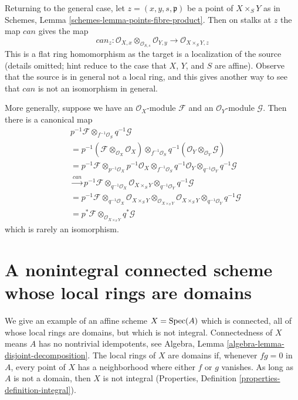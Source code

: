 \medskip\noindent
Returning to the general case, let $z = (x, y, s, \mathfrak p)$
be a point of $X \times_S Y$ as in
Schemes, Lemma \ref{schemes-lemma-points-fibre-product}.
Then on stalks at $z$ the map $can$ gives the map
$$
can_z :
\mathcal{O}_{X, x} \otimes_{\mathcal{O}_{S, s}} \mathcal{O}_{Y, y}
\longrightarrow
\mathcal{O}_{X \times_S Y, z}
$$
This is a flat ring homomorphism as the target is a localization of the
source (details omitted; hint reduce to the case that $X$, $Y$, and $S$
are affine).
Observe that the source is in general not a local ring, and this gives
another way to see that $can$ is not an isomorphism in general.

\medskip\noindent
More generally, suppose we have an $\mathcal{O}_X$-module $\mathcal{F}$ and an
$\mathcal{O}_Y$-module $\mathcal{G}$. Then there is a canonical map
\begin{align*}
& p^{-1}\mathcal{F} \otimes_{f^{-1}\mathcal{O}_S} q^{-1}\mathcal{G} \\
& =
p^{-1}(\mathcal{F} \otimes_{\mathcal{O}_X} \mathcal{O}_X)
\otimes_{f^{-1}\mathcal{O}_S}
q^{-1}(\mathcal{O}_Y \otimes_{\mathcal{O}_Y} \mathcal{G}) \\
& =
p^{-1}\mathcal{F} \otimes_{p^{-1}\mathcal{O}_X} p^{-1}\mathcal{O}_X
\otimes_{f^{-1}\mathcal{O}_S}
q^{-1}\mathcal{O}_Y \otimes_{q^{-1}\mathcal{O}_Y} q^{-1}\mathcal{G} \\
& \xrightarrow{can}
p^{-1}\mathcal{F} \otimes_{q^{-1}\mathcal{O}_X}
\mathcal{O}_{X \times_S Y}
\otimes_{q^{-1}\mathcal{O}_Y} q^{-1}\mathcal{G}  \\
& =
p^{-1}\mathcal{F} \otimes_{q^{-1}\mathcal{O}_X}
\mathcal{O}_{X \times_S Y}
\otimes_{\mathcal{O}_{X \times_S Y}}
\mathcal{O}_{X \times_S Y}
\otimes_{q^{-1}\mathcal{O}_Y} q^{-1}\mathcal{G}  \\
& =
p^*\mathcal{F} \otimes_{\mathcal{O}_{X \times_S Y}} q^*\mathcal{G}
\end{align*}
which is rarely an isomorphism.





\section{A nonintegral connected scheme whose local rings are domains}
\label{section-connected-locally-integral-not-integral}

\noindent
We give an example of an affine scheme $X = \mathop{\mathrm{Spec}}(A)$ which is
connected, all of whose local rings are domains, but which is not integral.
Connectedness of $X$ means $A$ has no nontrivial idempotents, see
Algebra, Lemma \ref{algebra-lemma-disjoint-decomposition}.
The local rings of $X$ are domains if, whenever $fg = 0$ in $A$, every
point of $X$ has a neighborhood where either $f$ or $g$ vanishes.
As long as $A$ is not a domain, then $X$ is not integral
(Properties, Definition \ref{properties-definition-integral}).

